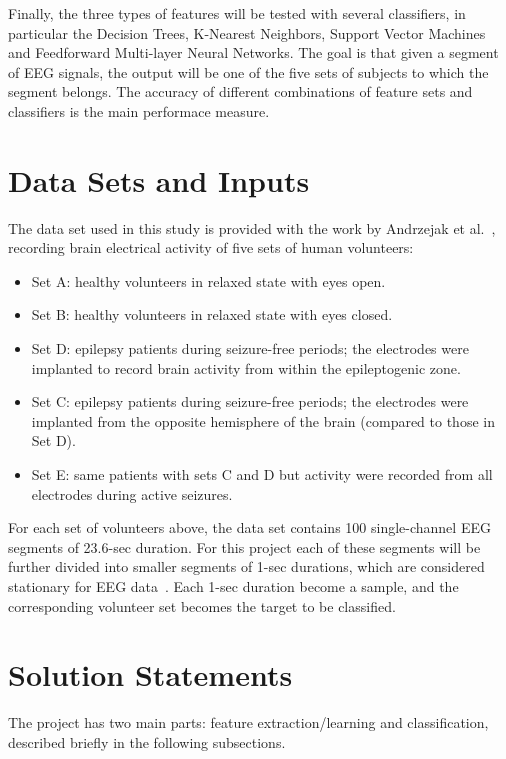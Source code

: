 \documentclass[12pt]{article}
\begin{document}
Finally, the three types of features will be tested with several classifiers, in particular the Decision Trees, K-Nearest Neighbors, Support Vector Machines and Feedforward Multi-layer Neural Networks. The goal is that given a segment of EEG signals, the output will be one of the five sets of subjects to which the segment belongs. The accuracy of different combinations of feature sets and classifiers is the main performace measure.

\section{Data Sets and Inputs}
\label{sec:data_set}
The data set used in this study is provided with the work by Andrzejak et al.~\cite{andrzejak2001indications}, recording brain electrical activity of five sets of human volunteers:
\begin{itemize}
\item Set A: healthy volunteers in relaxed state with eyes open.
\item Set B: healthy volunteers in relaxed state with eyes closed.
\item Set D: epilepsy patients during seizure-free periods; the electrodes were implanted to record brain activity from within the epileptogenic zone.
\item Set C: epilepsy patients during seizure-free periods; the electrodes were implanted from the opposite hemisphere of the brain (compared to those in Set D).
\item Set E: same patients with sets C and D but activity were recorded from all electrodes during active seizures.
\end{itemize}

For each set of volunteers above, the data set contains 100 single-channel EEG segments of 23.6-sec duration. For this project each of these segments will be further divided into smaller segments of 1-sec durations, which are considered stationary for EEG data~\cite{nigam2004neural}. Each 1-sec duration become a sample, and the corresponding volunteer set becomes the target to be classified.

\section{Solution Statements}

The project has two main parts: feature extraction/learning and classification, described briefly in the following subsections.
\end{document}
